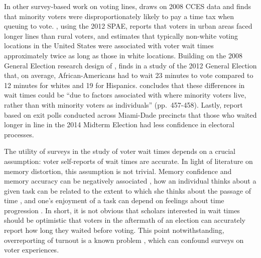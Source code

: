 \documentclass[12pt,titlepage]{article}
\begin{document}


In other survey-based work on voting lines, \cite{mukherjee:timetax}
draws on 2008 CCES data and finds that minority voters were
disproportionately likely to pay a time tax when queuing to vote.
\citet{kimball:voting}, using the 2012 SPAE, reports that voters in
urban areas faced longer lines than rural voters, and
\citet{pettigrew:racegapwaittimes} estimates that typically non-white
voting locations in the United States were associated with voter wait
times approximately twice as long as those in white locations.
Building on the 2008 General Election research design of
\citet{alvarez:survey}, \cite{stewart:waitingtovote2012} finds in a
study of the 2012 General Election that, on average, African-Americans
had to wait 23 minutes to vote compared to 12 minutes for whites and
19 for Hispanics. \citeauthor{stewart:waitingtovote2012} concludes
that these differences in wait times could be ``due to factors
associated with where minority voters live, rather than with minority
voters as individuals'' (pp.\ 457-458). Lastly,
\cite{herron:confidence} report based on exit polls conducted across
Miami-Dade precincts that those who waited longer in line in the 2014
Midterm Election had less confidence in electoral processes.

The utility of surveys in the study of voter wait times depends on a
crucial assumption: voter self-reports of wait times are accurate.  In
light of literature on memory distortion, this assumption is not
trivial. Memory confidence and memory accuracy can be negatively
associated \citep{hirstetal:sept11memories}, how an individual thinks
about a given task can be related to the extent to which she thinks
about the passage of time \citep{conti:timeflies}, and one's enjoyment
of a task can depend on feelings about time progression
\citep{sackettetal:timeflies}.  In short, it is not obvious that
scholars interested in wait times should be optimistic that voters in
the aftermath of an election can accurately report how long they
waited before voting.  This point notwithstanding, overreporting of
turnout is a known problem \citep{ansolhersh:bigdata}, which can
confound surveys on voter experiences.
\end{document}
